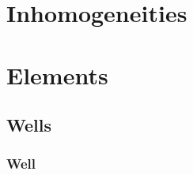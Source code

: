 \documentclass[letterpaper,10pt,english]{sphinxmanual}
\begin{document}
\section{Inhomogeneities}
\label{\detokenize{inhoms/inhoms::doc}}\label{\detokenize{inhoms/inhoms:inhomogeneities}}

\section{Elements}
\label{\detokenize{aems:elements}}\label{\detokenize{aems::doc}}

\subsection{Wells}
\label{\detokenize{wells/wellindex:wells}}\label{\detokenize{wells/wellindex::doc}}

\subsubsection{Well}
\label{\detokenize{wells/well::doc}}\label{\detokenize{wells/well:well}}
\end{document}

